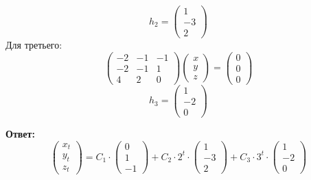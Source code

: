 \documentclass[a4paper,12pt]{article}
\begin{document}
\[
h_2 = \begin{pmatrix}
1 \\ -3 \\ 2
\end{pmatrix}
\]
Для третьего:
\[
\begin{pmatrix}
-2& -1 & -1 \\
-2 &-1& 1 \\
4 & 2  & 0
\end{pmatrix}
\begin{pmatrix}
x \\
y \\
z 
\end{pmatrix} = 
\begin{pmatrix}
0 \\ 0 \\ 0
\end{pmatrix}
\]
\[
h_3 = \begin{pmatrix}
1 \\ -2 \\ 0
\end{pmatrix}
\]
\begin{center}
\textbf{Ответ: } 
\[
\begin{pmatrix}
x_{t} \\
y_{t} \\
z_{t} 
\end{pmatrix}
=
C_1 \cdot 
\begin{pmatrix}
0 \\ 1 \\ -1
\end{pmatrix}
+ C_2 \cdot 2^t \cdot
\begin{pmatrix}
1 \\ -3 \\ 2
\end{pmatrix}
+ C_3 \cdot 3^t \cdot
\begin{pmatrix}
1 \\ -2 \\ 0
\end{pmatrix}
\]
\end{center}
\end{document}

